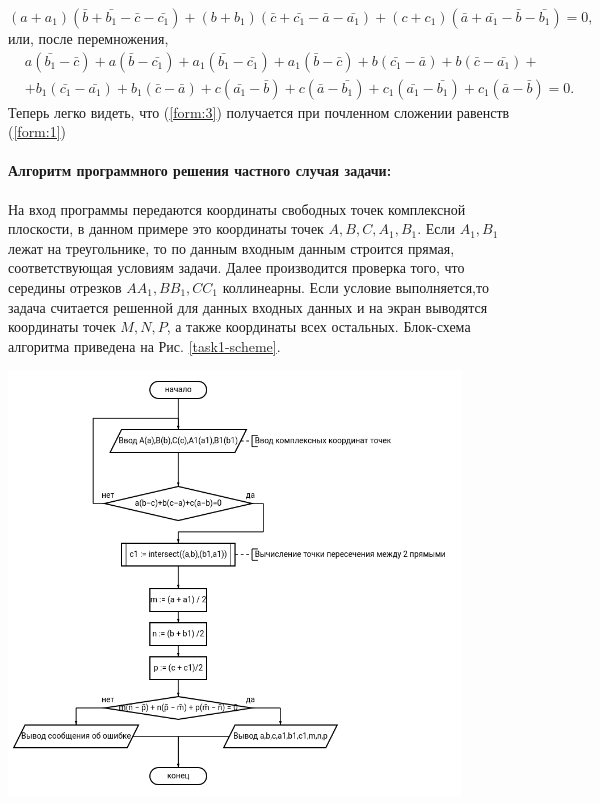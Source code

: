 \(
(a+a_1)(\bar{b}+\bar{b_1}-\bar{c}-\bar{c_1})+(b+b_1 )(\bar{c}+\bar{c_1}-\bar{a}-\bar{a_1})+(c+c_1)(\bar{a}+\bar{a_1}-\bar{b}-\bar{b_1})=0,
\) или, после перемножения,
\begin{equation}
    \begin{aligned}
         & a(\bar{b_1} - \bar{c}) + a(\bar{b}- \bar{c_1}) + a_1(\bar{b_1} - \bar{c_1}) + a_1(\bar{b}- \bar{c}) + b(\bar{c_1} - \bar{a}) + b(\bar{c}- \bar{a_1}) + \\
         & +b_1(\bar{c_1}-\bar{a_1})+b_1 (\bar{c}-\bar{a})+c(\bar{a_1}-\bar{b})+c(\bar{a}-\bar{b_1})+c_1 (\bar{a_1}-\bar{b_1} )+c_1(\bar{a}-\bar{b})=0.
    \end{aligned}
    \label{form:3}
\end{equation}
Теперь легко видеть, что (\ref{form:3}) получается при почленном сложении
равенств (\ref{form:1})
\paragraph*{Алгоритм программного решения частного случая задачи:} На вход программы передаются координаты свободных точек комплексной плоскости, в данном примере это координаты точек \(A,B,C,A_1,B_1\). Если \(A_1,B_1\) лежат на треугольнике, то по данным входным данным строится прямая, соответствующая условиям задачи. Далее производится проверка того, что середины отрезков \(AA_1,BB_1,CC_1\) коллинеарны. Если условие выполняется,то задача считается решенной для данных входных данных и на экран выводятся координаты точек \(M,N,P\), а также координаты всех остальных. Блок-схема алгоритма приведена на Рис. \ref{task1-scheme}.
\begin{center}
    \includegraphics[width=0.9\textwidth]{images/diagram-1.png}
    \label{task1-scheme}
\end{center}

